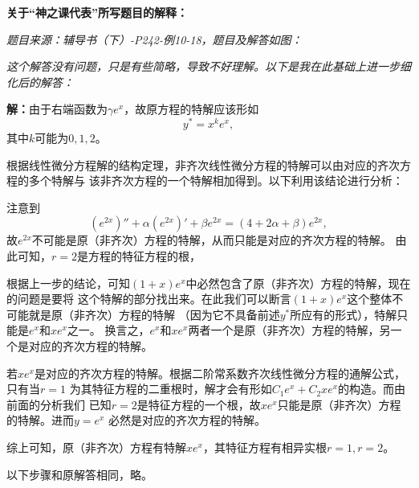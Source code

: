 \newpage

{\bf 关于“神之课代表”所写题目的解释：}

{\it 题目来源：辅导书（下）-P242-例10-18，题目及解答如图：}

\begin{center}
\end{center}

{\it 这个解答没有问题，只是有些简略，导致不好理解。以下是我在此基础上进一步细化后的解答：}

{\bf 解：}由于右端函数为$\gamma e^x$，故原方程的特解应该形如
$$y^*=x^ke^x,$$
其中$k$可能为$0,1,2$。

根据线性微分方程解的结构定理，非齐次线性微分方程的特解可以由对应的齐次方程的多个特解与
该非齐次方程的一个特解相加得到。以下利用该结论进行分析：

注意到
$$(e^{2x})''+\alpha(e^{2x})'+\beta e^{2x}
=(4+2\alpha+\beta)e^{2x},$$
故$e^{2x}$不可能是原（非齐次）方程的特解，从而只能是对应的齐次方程的特解。
由此可知，$r=2$是方程的特征方程的根，

根据上一步的结论，可知$(1+x)e^x$中必然包含了原（非齐次）方程的特解，现在的问题是要将
这个特解的部分找出来。在此我们可以断言$(1+x)e^x$这个整体不可能就是原（非齐次）方程的特解
（因为它不具备前述$y^*$所应有的形式），特解只能是$e^x$和$xe^x$之一。
换言之，$e^x$和$xe^x$两者一个是原（非齐次）方程的特解，另一个是对应的齐次方程的特解。

若$xe^x$是对应的齐次方程的特解。根据二阶常系数齐次线性微分方程的通解公式，只有当$r=1$
为其特征方程的二重根时，解才会有形如$C_1e^x+C_2xe^x$的构造。而由前面的分析我们
已知$r=2$是特征方程的一个根，故$xe^x$只能是原（非齐次）方程的特解。进而$y=e^x$
必然是对应的齐次方程的特解。

综上可知，原（非齐次）方程有特解$xe^x$，其特征方程有相异实根$r=1,r=2$。

以下步骤和原解答相同，略。

